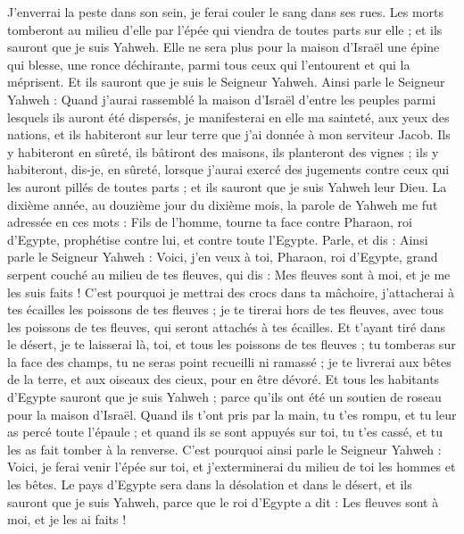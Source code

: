 \begin{multicols}{2}
J'enverrai la peste dans son sein, je ferai couler le sang dans ses rues. Les morts tomberont au milieu d'elle par l'épée qui viendra de toutes parts sur elle ; et ils sauront que je suis Yahweh.
Elle ne sera plus pour la maison d'Israël une épine qui blesse, une ronce déchirante, parmi tous ceux qui l'entourent et qui la méprisent. Et ils sauront que je suis le Seigneur Yahweh.
Ainsi parle le Seigneur Yahweh : Quand j'aurai rassemblé la maison d'Israël d'entre les peuples parmi lesquels ils auront été dispersés, je manifesterai en elle ma sainteté, aux yeux des nations, et ils habiteront sur leur terre que j'ai donnée à mon serviteur Jacob.
Ils y habiteront en sûreté, ils bâtiront des maisons, ils planteront des vignes ; ils y habiteront, dis-je, en sûreté, lorsque j'aurai exercé des jugements contre ceux qui les auront pillés de toutes parts ; et ils sauront que je suis Yahweh leur Dieu.
\VerseOne{}La dixième année, au douzième jour du dixième mois, la parole de Yahweh me fut adressée en ces mots :
Fils de l'homme, tourne ta face contre Pharaon, roi d'Egypte, prophétise contre lui, et contre toute l'Egypte.
Parle, et dis : Ainsi parle le Seigneur Yahweh : Voici, j'en veux à toi, Pharaon, roi d'Egypte, grand serpent couché au milieu de tes fleuves, qui dis : Mes fleuves sont à moi, et je me les suis faits !
C'est pourquoi je mettrai des crocs dans ta mâchoire, j'attacherai à tes écailles les poissons de tes fleuves ; je te tirerai hors de tes fleuves, avec tous les poissons de tes fleuves, qui seront attachés à tes écailles.
Et t'ayant tiré dans le désert, je te laisserai là, toi, et tous les poissons de tes fleuves ; tu tomberas sur la face des champs, tu ne seras point recueilli ni ramassé ; je te livrerai aux bêtes de la terre, et aux oiseaux des cieux, pour en être dévoré.
Et tous les habitants d'Egypte sauront que je suis Yahweh ; parce qu'ils ont été un soutien de roseau pour la maison d'Israël.
Quand ils t'ont pris par la main, tu t'es rompu, et tu leur as percé toute l'épaule ; et quand ils se sont appuyés sur toi, tu t'es cassé, et tu les as fait tomber à la renverse.
C'est pourquoi ainsi parle le Seigneur Yahweh : Voici, je ferai venir l'épée sur toi, et j'exterminerai du milieu de toi les hommes et les bêtes.
Le pays d'Egypte sera dans la désolation et dans le désert, et ils sauront que je suis Yahweh, parce que le roi d'Egypte a dit : Les fleuves sont à moi, et je les ai faits !

\end{multicols}
